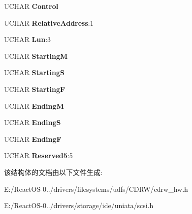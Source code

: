 \begin{DoxyCompactItemize}
U\+C\+H\+AR {\bfseries Control}
\item 
\mbox{\label{struct___c_d_b_1_1___r_e_a_d___c_d___m_s_f_abb9b1141d50897fc7e8a4f00d58595cd}} 
U\+C\+H\+AR {\bfseries Relative\+Address}\+:1
\item 
\mbox{\label{struct___c_d_b_1_1___r_e_a_d___c_d___m_s_f_a67e025d3a3899b67bbfb84149811a40a}} 
U\+C\+H\+AR {\bfseries Lun}\+:3
\item 
\mbox{\label{struct___c_d_b_1_1___r_e_a_d___c_d___m_s_f_a709afb01789d698ab8dfa4784293dc9e}} 
U\+C\+H\+AR {\bfseries StartingM}
\item 
\mbox{\label{struct___c_d_b_1_1___r_e_a_d___c_d___m_s_f_a145169874f9d97952333f0abfe314e63}} 
U\+C\+H\+AR {\bfseries StartingS}
\item 
\mbox{\label{struct___c_d_b_1_1___r_e_a_d___c_d___m_s_f_abce453d5b7d2ffe5d98f1b6b1f51028f}} 
U\+C\+H\+AR {\bfseries StartingF}
\item 
\mbox{\label{struct___c_d_b_1_1___r_e_a_d___c_d___m_s_f_aa8a12926a2eface669e2bcd4c164a07f}} 
U\+C\+H\+AR {\bfseries EndingM}
\item 
\mbox{\label{struct___c_d_b_1_1___r_e_a_d___c_d___m_s_f_a98ddc49a64680c304a7b775ba794131d}} 
U\+C\+H\+AR {\bfseries EndingS}
\item 
\mbox{\label{struct___c_d_b_1_1___r_e_a_d___c_d___m_s_f_ae6010a7e3ea5a2c47e8672a0de009516}} 
U\+C\+H\+AR {\bfseries EndingF}
\item 
\mbox{\label{struct___c_d_b_1_1___r_e_a_d___c_d___m_s_f_a14503064d13ec4566a98fb28d84adaf3}} 
U\+C\+H\+AR {\bfseries Reserved5}\+:5
\end{DoxyCompactItemize}


该结构体的文档由以下文件生成\+:\begin{DoxyCompactItemize}
\item 
E\+:/\+React\+O\+S-\/0../drivers/filesystems/udfs/\+C\+D\+R\+W/cdrw\+\_\+hw.\+h\item 
E\+:/\+React\+O\+S-\/0../drivers/storage/ide/uniata/scsi.\+h\end{DoxyCompactItemize}
